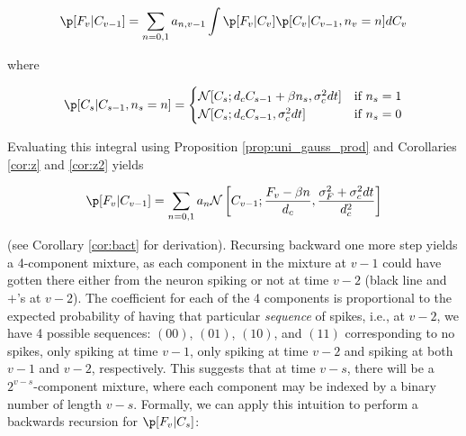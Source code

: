 \begin{align} \label{eq:mix1}
\p[F_v | C_{v-1}] = \sum_{n=0,1} a_{n,v-1} \int \p[F_v | C_v] \p[C_v | C_{v-1}, n_v=n] dC_v
\end{align}

\noindent where

\begin{align}
\p[C_s | C_{s-1}, n_s=n] =
\begin{cases}
\mathcal{N}[C_s; d_c C_{s-1} + \beta n_s, \sigma_c^2 dt] & \text{if } n_s=1\\
\mathcal{N}[C_s; d_c C_{s-1}, \sigma_c^2 dt] & \text{if } n_s=0
\end{cases}
\end{align}

\noindent Evaluating this integral using Proposition \ref{prop:uni_gauss_prod} and Corollaries \ref{cor:z} and \ref{cor:z2} yields

\begin{align}
\p[F_v | C_{v-1}] = \sum_{n=0,1} a_n \mathcal{N}\left[C_{v-1};\frac{F_v - \beta n}{d_c}, \frac{\sigma_F^2 + \sigma_c^2 dt}{d_c^2}\right]
\end{align}

\noindent (see Corollary \ref{cor:bact} for derivation). Recursing backward one more step yields a 4-component mixture, as each component in the mixture at $v-1$ could have gotten there either from the neuron spiking or not at time $v-2$ (black line and $+$'s at $v-2$).  The coefficient for each of the 4 components is proportional to the expected probability of having that particular \emph{sequence} of spikes, i.e., at $v-2$, we have 4 possible sequences: $(00)$, $(01)$, $(10)$, and $(11)$ corresponding to no spikes, only spiking at time $v-1$, only spiking at time $v-2$ and spiking at both $v-1$ and $v-2$, respectively.  This suggests that at time $v-s$, there will be a $2^{v-s}$-component mixture, where each component may be indexed by a binary number of length $v-s$. %
Formally, we can apply this intuition to perform a backwards recursion for $\p[F_v | C_s]$:

